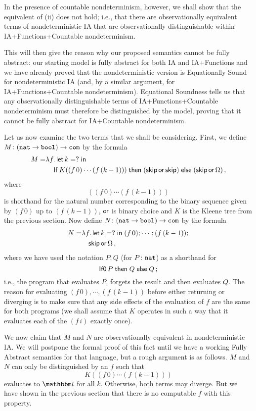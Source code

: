 In the presence of countable nondeterminism, however, we shall show that the equivalent of (ii) does not hold; i.e., that there are observationally equivalent terms of nondeterministic IA that are observationally distinguishable within IA+Functions+Countable nondeterminism.

This will then give the reason why our proposed semantics cannot be fully abstract: our starting model is fully abstract for both IA and IA+Functions and we have already proved that the nondeterministic version is Equationally Sound for nondeterministic IA (and, by a similar argument, for IA+Functions+Countable nondeterminism).  
Equational Soundness tells us that any observationally distinguishable terms of IA+Functions+Countable nondeterminism must therefore be distinguished by the model, proving that it cannot be fully abstract for IA+Countable nondeterminism.

Let us now examine the two terms that we shall be considering.  
First, we define $M \colon ({\mathtt{nat}} \to {\mathtt{bool}}) \to {\mathtt{com}}$ by the formula
\begin{align*}
  M=& \lambda f.\operatorname{\mathsf{let}} k=?\mathrel{\mathsf{in}} \\
  & \hspace{10pt} \operatorname{\mathsf{If}} K((f\,0)\cdots(f\,(k-1))) \mathrel{\mathsf{then}} ({\mathsf{skip}}\mathop{\mathsf{or}}{\mathsf{skip}}) \mathrel{\mathsf{else}} ({\mathsf{skip}} \mathop{\mathsf{or}} \Omega)\,,
\end{align*}
where
\[
  ((f\,0)\cdots(f\,(k-1)))
  \]
is shorthand for the natural number corresponding to the binary sequence given by $(f\,0)$ up to $(f\,(k-1))$, $\mathop{\mathsf{or}}$ is binary choice and $K$ is the Kleene tree from the previous section.
Now define $N \colon ({\mathtt{nat}} \to {\mathtt{bool}}) \to {\mathtt{com}}$ by the formula
\begin{align*}
  N=& \lambda f.\operatorname{\mathsf{let}} k=?\mathrel{\mathsf{in}} (f\,0);\cdots;(f\,(k-1));\\
  &\hspace{10pt}{\mathsf{skip}} \mathop{\mathsf{or}} \Omega\,,
\end{align*}
where we have used the notation $P;Q$ (for $P \colon {\mathtt{nat}}$) as a shorthand for
\[
  \operatorname{{\mathsf{If0}}} P \mathrel{\mathsf{then}} Q \mathrel{\mathsf{else}} Q\,;
  \]
i.e., the program that evaluates $P$, forgets the result and then evaluates $Q$.
The reason for evaluating $(f\,0), \cdots, (f\,(k-1))$ before either returning or diverging is to make sure that any side effects of the evaluation of $f$ are the same for both programs (we shall assume that $K$ operates in such a way that it evaluates each of the $(f\,i)$ exactly once).

We now claim that $M$ and $N$ are observationally equivalent in nondeterministic IA.  
We will postpone the formal proof of this fact until we have a working Fully Abstract semantics for that language, but a rough argument is as follows.  
$M$ and $N$ can only be distinguished by an $f$ such that
\[
  K((f\,0)\cdots(f\,(k-1)))
  \]
evaluates to $\true$ for all $k$.  
Otherwise, both terms may diverge.  
But we have shown in the previous section that there is no computable $f$ with this property.

